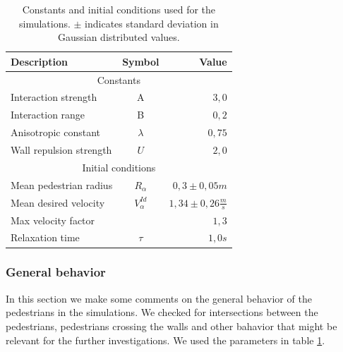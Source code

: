 \begin{table}[ht]
    \begin{center}
        \begin{tabular}{l c r}
            \toprule
            \textbf{Description} & \textbf{Symbol} & \textbf{Value} \\
            \midrule
            \multicolumn{3}{c}{\textsf{Constants}}\\
            Interaction strength & A & $3,0$ \\
            Interaction range & B & $0,2$ \\
            Anisotropic constant & $\lambda$ & $0,75$ \\
            Wall repulsion strength & $U$ &  $2,0$ \\
            \midrule
            \multicolumn{3}{c}{\textsf{Initial conditions}}\\
            Mean pedestrian radius & $R_\alpha$ & $0,3 \pm 0,05 m$\\
            Mean desired velocity &  $V^{Id}_\alpha$ &  $1,34 \pm 0,26
            \frac{m}{s}$ \\
            Max velocity factor &  &  $1,3$ \\
            Relaxation time & $\tau$ & $1,0 s$\\
            \bottomrule
        \end{tabular}
        \caption[Constants and initial conditions]{Constants and initial
        conditions used for the simulations. $\pm$ indicates standard
        deviation in Gaussian distributed values.}
        \label{tbl:parameter-settings}
    \end{center}
\end{table}

\subsubsection{General behavior}
In this section we make some comments on the general behavior of
the pedestrians in the simulations. We checked for intersections between
the pedestrians, pedestrians crossing the walls and other bahavior that might
be relevant for the further investigations. We used the parameters in table
\ref{tbl:parameter-settings}.\\

